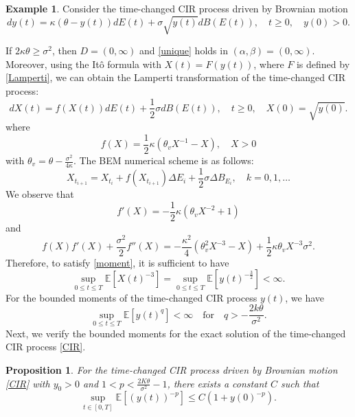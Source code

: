 \documentclass[10pt,reqno,final]{amsart}
\theoremstyle{plain}
\newtheorem{proposition}{Proposition}[section]
\theoremstyle{definition}
\newtheorem{example}{Example}
\theoremstyle{remark}
\numberwithin{equation}{section}
\numberwithin{figure}{section}
\numberwithin{table}{section}
\begin{document}
\begin{example}
	Consider the time-changed CIR process driven by Brownian motion
	\begin{equation}\label{CIR}
		dy(t)=\kappa(\theta-y(t))dE(t)+\sigma\sqrt{y(t)}dB(E(t)),\quad t\geq0,\quad y(0)>0.
	\end{equation}
\end{example}
If $2\kappa\theta\geq\sigma^{2}$, then $D=(0,\infty)$ and \cref{unique} holds in $(\alpha, \beta) = (0,\infty)$. 
Moreover, using the Itô formula with $X(t) = F(y(t))$, where $F$ is defined by \cref{Lamperti}, we can obtain the Lamperti transformation of the time-changed CIR process:
\begin{equation}
	dX(t)=f(X(t))dE(t)+\frac12\sigma dB(E(t)),\quad t\geq0,\quad X(0)=\sqrt{y(0)}.
\end{equation}
where
\begin{equation}
	f(X)=\dfrac{1}{2}\kappa\left(\theta_vX^{-1}-X\right),\quad X>0
\end{equation}
with $\theta_v=\theta-\frac{\sigma^2}{4\kappa}$. The BEM numerical scheme is as follows:
\begin{equation}
	X_{t_{i+1}}=X_{t_{i}}+f(X_{t_{i+1}})\Delta E_i+\frac{1}{2}\sigma\Delta B_{E_i},\quad k=0,1,\dots 
\end{equation}
We observe that
\begin{equation}
	f'(X)=-\frac{1}{2}\kappa(\theta_vX^{-2}+1)
\end{equation}
and
\begin{equation}
	f(X)f'(X)+\frac{\sigma^2}{2}f''(X)=-\frac{\kappa^2}{4}(\theta_v^2X^{-3}-X)+\frac{1}{2}\kappa\theta_vX^{-3}\sigma^2.
\end{equation}
Therefore, to satisfy \cref{moment}, it is sufficient to have
\begin{equation}
	\sup_{0\leq t\leq T}\mathbb{E}[X(t)^{-3}]=\sup_{0\leq t\leq T}\mathbb{E}[y(t)^{-\frac{3}{2}}] < \infty.
\end{equation}
For the bounded moments of the time-changed CIR process $y(t)$, we have
\begin{equation}
	\sup\limits_{0\leq t\leq T}\mathbb{E}[y(t)^q]<\infty\quad\text{for}\quad q>-\frac{2k\theta}{\sigma^2}.
\end{equation}
Next, we verify the bounded moments for the exact solution of the time-changed CIR process \cref{CIR}.
\begin{proposition}
	For the time-changed CIR process driven by Brownian motion \cref{CIR} with $y_0>0$ and $1<p<\frac{2K\theta}{\sigma^2}-1$, there exists a constant $C$ such that
	\begin{equation*}
		\sup\limits_{t\in[0,T]}\mathbb{E}\left[\left(y(t)\right)^{-p}\right]\leq C(1+y(0)^{-p}).
	\end{equation*}
\end{proposition}
\end{document}
